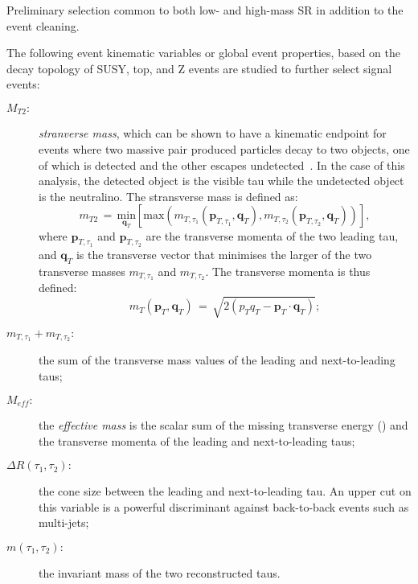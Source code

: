 	\begin{table}[!hbt]
	\centering
	\caption{Preliminary selection common to both low- and high-mass \ac{SR} in addition to the event cleaning.}
		
	\label{tab:analysis_preselection}
	\end{table}
	The following event kinematic variables or global event properties, based on the decay topology of \ac{SUSY}, top, and Z events are studied to further select signal events:
	\begin{description}
	\item [\boldmath $M_{T2}:$] \textit{stranverse mass}, which can be shown to have a kinematic endpoint for events where two massive pair produced particles decay to two objects, one of which is detected and the other escapes undetected~\cite{LESTER199999,Barr:2003rg}. In the case of this analysis, the detected object is the visible tau while the undetected object is the neutralino.
	The stransverse mass is defined as:
	$$ m_{T2}\,=\,\underset{\textbf{q}_T}{\mathrm{min}}\left[\mathrm{max}\left(m_{T,\tau_1}(\textbf{p}_{T,\tau_1},\textbf{q}_T),m_{T,\tau_2}(\textbf{p}_{T,\tau_2},\textbf{q}_T)\right)\right],$$
	where $\textbf{p}_{T,\tau_1}$ and $\textbf{p}_{T,\tau_2}$ are the transverse momenta of the two leading tau, and  $\textbf{q}_T$ is the transverse vector that minimises the larger of the two transverse masses $m_{T,\tau_1}$ and $m_{T,\tau_2}$. The transverse momenta is thus defined:
	$$ m_{T}(\textbf{p}_T,\textbf{q}_T)\,=\,\sqrt{2(p_Tq_T-\textbf{p}_T\cdot\textbf{q}_T)};$$
	\item [\boldmath $m_{T,\tau_1}+m_{T,\tau_2}:$] the sum of the transverse mass values of the leading and next-to-leading taus;
	\item [\boldmath $M_{eff}:$] the \textit{effective mass} is the scalar sum of the missing transverse energy (\met) and the transverse momenta of the leading and next-to-leading taus;
	\item [\boldmath $\Delta R(\tau_1,\tau_2):$] the cone size between the leading and next-to-leading tau. An upper cut on this variable is a powerful discriminant against back-to-back events such as multi-jets;
	\item [\boldmath $m(\tau_1,\tau_2):$] the invariant mass of the two reconstructed taus.
	\end{description}
	
